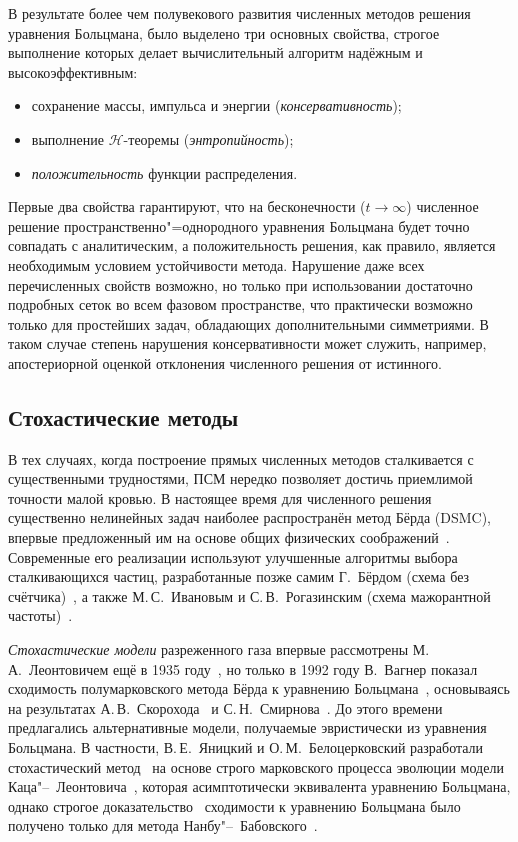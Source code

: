В результате более чем полувекового развития численных методов решения уравнения Больцмана,
было выделено три основных свойства, строгое выполнение которых делает вычислительный алгоритм
надёжным и высокоэффективным:
\begin{itemize}
    \item сохранение массы, импульса и энергии (\emph{консервативность});
    \item выполнение \(\mathcal{H}\)-теоремы (\emph{энтропийность});
    \item \emph{положительность} функции распределения.
\end{itemize}
Первые два свойства гарантируют, что на бесконечности (\(t\to\infty\)) численное решение
пространственно"=однородного уравнения Больцмана будет точно совпадать с аналитическим,
а положительность решения, как правило, является необходимым условием устойчивости метода.
Нарушение даже всех перечисленных свойств возможно, но только при использовании достаточно подробных сеток
во всем фазовом пространстве, что практически возможно только для простейших задач,
обладающих дополнительными симметриями. В таком случае степень нарушения консервативности
может служить, например, апостериорной оценкой отклонения численного решения от истинного.

\subsection{Стохастические методы}

В тех случаях, когда построение прямых численных методов сталкивается с существенными трудностями,
ПСМ нередко позволяет достичь приемлимой точности малой кровью.
В настоящее время для численного решения существенно нелинейных задач наиболее распространён
метод Бёрда (DSMC), впервые предложенный им на основе общих физических соображений~\cite{Bird1963}.
Современные его реализации используют улучшенные алгоритмы выбора сталкивающихся частиц,
разработанные позже самим Г.~Бёрдом (схема без счётчика)~\cite{Bird1989},
а также М.\,С.~Ивановым и С.\,В.~Рогазинским (схема мажорантной частоты)~\cite{Ivanov1988}.

\emph{Стохастические модели} разреженного газа впервые рассмотрены М.\,А.~Леонтовичем
ещё в 1935 году~\cite{Leontovich1935}, но только в 1992 году В.~Вагнер показал сходимость
полумарковского метода Бёрда к уравнению Больцмана~\cite{Wagner1992},
основываясь на результатах А.\,В.~Скорохода~\cite{Skorokhod1983} и С.\,Н.~Смирнова~\cite{Smirnov1989}.
До этого времени предлагались альтернативные модели, получаемые эвристически из уравнения Больцмана.
В частности, В.\,Е.~Яницкий и О.\,М.~Белоцерковский разработали стохастический метод~\cite{Yanitskij1975}
на основе строго марковского процесса эволюции модели Каца"--~Леонтовича~\cite{Kac1965, Kac1973},
которая асимптотически эквивалента уравнению Больцмана, однако строгое доказательство~\cite{Babovsky1989}
сходимости к уравнению Больцмана было получено только для метода Нанбу"--~Бабовского~\cite{Nanbu1980, Babovsky1986}.

